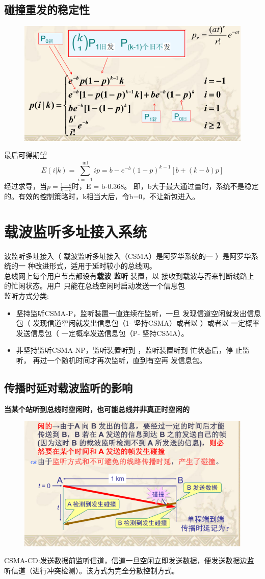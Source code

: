 \subsection{碰撞重发的稳定性}
\begin{figure}[H]
	\centering
	\includegraphics[width=0.7\linewidth]{figures/screenshot008}
	\caption{}
	\label{fig:screenshot008}
\end{figure}
最后可得期望
\[ 
E(i|k) = \sum_{i=-1}^{\inf}ip = b - e^{-b}(1-p)^{k-1}[b+(k-b)p]
\]
经过求导，当$ p = \frac{1-b}{k-b} $时，E = b-0.368。
即，b大于最大通过量时，系统不是稳定的。有效的控制策略时，k相当大后，令b=0，不让新包进入。
\section{载波监听多址接入系统}
波监听多址接入（ 载波监听多址接入（CSMA）是阿罗华系统的一 ）是阿罗华系统的一
种改进形式，适用于延时较小的总线网。\\
 总线网上每个用户节点都设有\textbf{载波 监听} 装置，以
接收到载波与否来判断线路上的忙闲状态。用户
只能在总线空闲时启动发送一个信息包\\
监听方式分类:
\begin{itemize}
	\item 坚持监听CSMA-P，监听装置一直连续在监听，一旦
	发现信道空闲就发出信息包（ 发现信道空闲就发出信息包（1- 坚持CSMA）或者以 ）或者以
	一定概率发送信息包（ 一定概率发送信息包（P- 坚持CSMA）。
	\item 非坚持监听CSMA-NP，监听装置听到 ，监听装置听到 忙状态后，停
	止监听， 再过一个随机时间才再次监听，直到有空再
	发信息包。
\end{itemize}
\subsection{传播时延对载波监听的影响}
\textbf{当某个站听到总线时空闲时，也可能总线并非真正时空闲的}
\begin{figure}[htbp]
	\centering
	\includegraphics[width=0.7\linewidth]{figures/screenshot009}
	\caption{}
	\label{fig:screenshot009}
\end{figure}
CSMA-CD:发送数据前监听信道，信道一旦空闲立即发送数据，便发送数据边监听信道（进行冲突检测）。该方式为完全分散控制方式。
